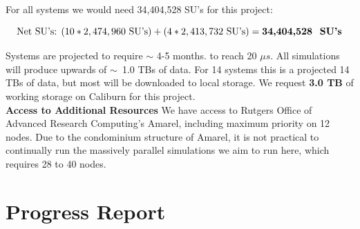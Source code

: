 \documentclass[oneside]{report}
\begin{document}
For all systems we would need 34,404,528 SU's for this project: 

\[\textrm{Net SU's:  } (10*2,474,960 \textrm{ SU's}) + (4*2,413,732 \textrm{ SU's}) = \textbf{34,404,528 \textrm{ SU's}} \]

Systems are projected to require $\sim$ 4-5 months. to reach 20 $\mu s$. All simulations will produce upwards of $\sim$~1.0 TBs of data. For 14 systems this is a projected {14 TBs of data}, but most will be downloaded to local storage.  We request \textbf{3.0 TB} of working storage on Caliburn for this project.  \\

{\bf Access to Additional Resources}
We have access to Rutgers Office of Advanced Research Computing's Amarel, including maximum priority on 12 nodes. Due to the condominium structure of Amarel, it is not practical to continually run the massively parallel simulations we aim to run here, which requires 28 to 40 nodes.\\

\section*{Progress Report}
\end{document}
